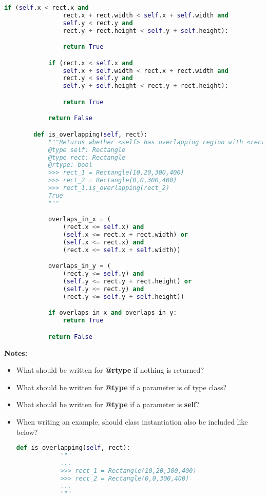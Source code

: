 \documentclass[12pt]{article}
\begin{document}
\begin{enumerate}
\begin{lstlisting}[language=Python]
            if (self.x < rect.x and
                rect.x + rect.width < self.x + self.width and
                self.y < rect.y and
                rect.y + rect.height < self.y + self.height):

                return True

            if (rect.x < self.x and
                self.x + self.width < rect.x + rect.width and
                rect.y < self.y and
                self.y + self.height < rect.y + rect.height):

                return True

            return False

        def is_overlapping(self, rect):
            """Returns whether <self> has overlapping region with <rect>
            @type self: Rectangle
            @type rect: Rectangle
            @rtype: bool
            >>> rect_1 = Rectangle(10,20,300,400)
            >>> rect_2 = Rectangle(0,0,300,400)
            >>> rect_1.is_overlapping(rect_2)
            True
            """

            overlaps_in_x = (
                (rect.x <= self.x) and
                (self.x <= rect.x + rect.width) or
                (self.x <= rect.x) and
                (rect.x <= self.x + self.width))

            overlaps_in_y = (
                (rect.y <= self.y) and
                (self.y <= rect.y + rect.height) or
                (self.y <= rect.y) and
                (rect.y <= self.y + self.height))

            if overlaps_in_x and overlaps_in_y:
                return True

            return False


    \end{lstlisting}

    \bigskip

    \textbf{Notes:}

    \begin{itemize}
    \item What should be written for \textbf{@rtype} if nothing is returned?
    \item What should be written for \textbf{@type} if a parameter is of type class?
    \item What should be written for \textbf{@type} if a parameter is \textbf{self}?
    \item When writing an example, should class instantiation also be included like below?

    \begin{lstlisting}[language=Python]
        def is_overlapping(self, rect):
            """
            ...
            >>> rect_1 = Rectangle(10,20,300,400)
            >>> rect_2 = Rectangle(0,0,300,400)
            ...
            """
    \end{lstlisting}
    \end{itemize}
\end{enumerate}
\end{document}

